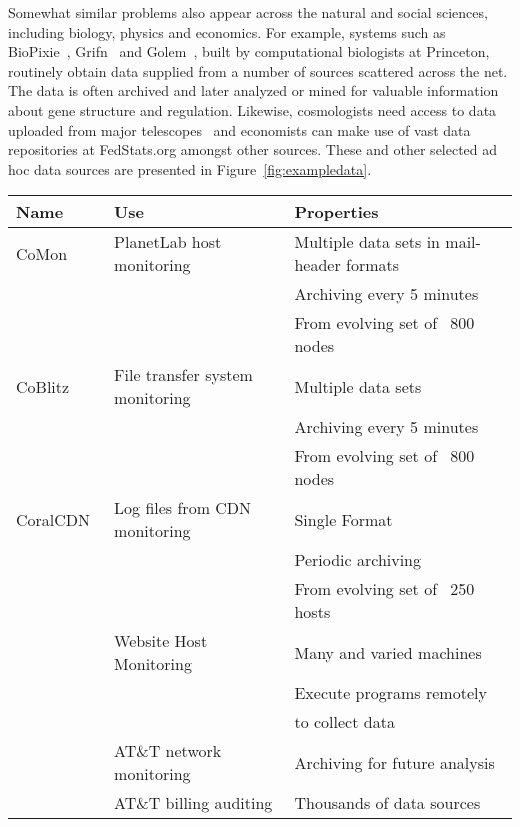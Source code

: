 Somewhat similar problems also appear across the natural and social
sciences, including biology, physics and economics.  For example,
systems such as BioPixie~\cite{biopixie}, Grifn~\cite{grifn} and
Golem~\cite{golem}, built by computational biologists at Princeton,
routinely obtain data supplied from a number of sources scattered
across the net.  The data is often archived and later analyzed or
mined for valuable information about gene structure and regulation.
Likewise, cosmologists need access to data uploaded from major
telescopes~\cite{sdss} and economists can make use of vast data
repositories at FedStats.org amongst other sources.  These and other
selected ad hoc data sources are presented in
Figure~\ref{fig:exampledata}.

\begin{figure*}
\begin{center}
\begin{tabular}{|l|l|l|}
\hline\hline
Name & Use & Properties 
\\\hline\hline
CoMon~\cite{comon} & PlanetLab host monitoring & Multiple data sets in mail-header formats\\
                                       && Archiving every 5 minutes \\
                                       && From evolving set of ~800 nodes \\\hline
CoBlitz~\cite{coblitz} & File transfer system monitoring & Multiple data sets \\
                                       && Archiving every 5 minutes \\
                                       && From evolving set of ~800 nodes \\\hline
CoralCDN~\cite{coral} & Log files from CDN monitoring & Single Format \\
                                       && Periodic archiving \\
                                       && From evolving set of ~250 hosts \\\hline
\vizGems{}       & Website Host Monitoring & Many and varied machines \\
                 &                         & Execute programs remotely\\
                 &                         & to collect data\\\hline
\darkstar{}      & AT\&T network monitoring & Archiving for future analysis \\\hline
\ningaui{}       & AT\&T billing auditing   & Thousands of data sources\\

\end{tabular}
\end{center}
\end{figure*}
